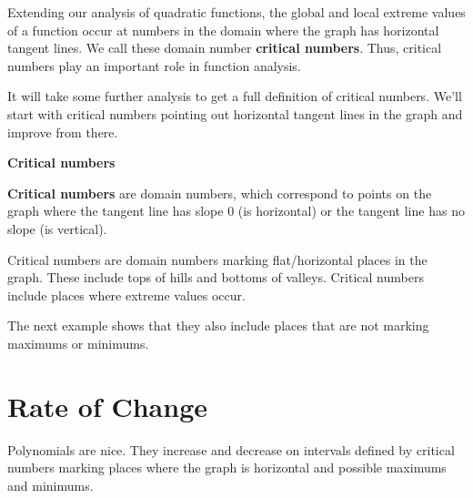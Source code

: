 \documentclass{ximera}
\begin{document}
Extending our analysis of quadratic functions, the global and local extreme values of a function occur at numbers in the domain where the graph has horizontal tangent lines. We call these domain number \textbf{critical numbers}.  Thus, critical numbers play an important role in function analysis.  


It will take some further analysis to get a full definition of critical numbers. We'll start with critical numbers pointing out horizontal tangent lines in the graph and improve from there.









\begin{definition} \item \textbf{\textcolor{green!50!black}{Critical numbers}}

\textbf{Critical numbers} are domain numbers, which correspond to points on the graph where the tangent line has slope $0$ (is horizontal) or the tangent line has no slope (is vertical).

\end{definition}




Critical numbers are domain numbers marking flat/horizontal places in the graph.  These include tops of hills and bottoms of valleys. Critical numbers include places where extreme values occur.


The next example shows that they also include places that are not marking maximums or minimums.














\section{Rate of Change}



Polynomials are nice.  They increase and decrease on intervals defined by critical numbers marking places where the graph is horizontal and possible maximums and minimums.
\end{document}
